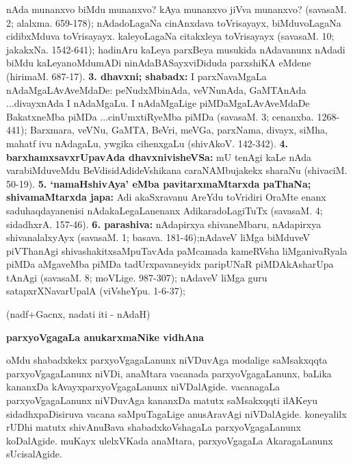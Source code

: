 \medskip
\noindent
nAda munanxvo biMdu munanxvo? kAya munanxvo jiVva \hbox{munanxvo}? (savasaM. 2; alalxma. 659-178); nAdadoLagaNa cinAnxdava toVrisayayx, biMduvoLagaNa cidibxMduva toVrisayayx. kaleyoLagaNa citakxleya toVrisayayx (savasaM. 10; jakakxNa. 1542-641); hadinAru kaLeya parxBeya musukida nAdavanunx nAdadi biMdu kaLeyanoMdumADi ninAda\-BASayxviDiduda parxshiKA eMdene (hirimaM. 687-17). \textbf{3. dhavxni; shabadx:}
I parxNavaMgaLa nAdaMgaLAvAveMdaDe: peNudxMbi\-nAda, veVNunAda, GaMTAnAda ...divayxnAda I nAdaM\-gaLu. I nAdaMgaLige piMDaMgaLAvAveMdaDe BakatxneMba piMDa ...cinUmxtiR\-yeMba piMDa (savasaM. 3; cenanxba. 1268-441); Barxmara, veVNu, GaMTA, BeVri, meVGa, parxNama, divayx, siMha, mahatf ivu nAda\-gaLu, ywgika cihenx\-gaLu (shivAkoV. 142-342). \textbf{4. barxhamx\-savxrUpavAda dhavxnivisheVSa:}
mU{\ru} te{\ra}nAgi kaLe nAda varabiMdu\-veMdu BeVdisidAdideVshikana caraNAMbujakekx \hbox{sharaNu} (shivaciM. 50-19). \textbf{5. `namaHshivAya' eMba pavitarxmaMtarxda paThaNa; shivamaMtarxda japa:} Adi akaSxravanu AreYdu toVridiri OraMte enanx saduhaqdayanenisi nAdakaLegaLanenanx AdikaradoLagiTuTx (savasaM. 4; \hbox{sidadhxrA}. 157-46). \textbf{6. parashiva:} nAdapirxya shiva\-neMbaru, nAdapirxya shivanalalxyAyx (savasaM. 1; basava. 181-46);\break nAdaveV liMga biMduveV piVThanAgi shivashakitxsaMpuTavAda \hbox{paMcamada} kameRVsha liMganivaRyala piMDa aMgaveMba piMDa tadUrxpa\-vaneyidx paripUNaR piMDAkAsharUpa tAnAgi (savasaM. 8; moVLige. 987-307); nAdaveV liMga guru satapxrXNava\-rUpalA (viVsheYpu. 1-6-37);

\medskip
\noindent
(nadf+Gacnx, nadati iti - nAdaH)

\newpage

\begin{center}
{\large\bf parxyoVgagaLa anukarxmaNike vidhAna}
\end{center}
\medskip

oMdu shabadxkekx parxyoVgagaLanunx niVDuvAga modalige saMsakxqqta parxyoVgagaLanunx niVDi, anaMtara vacanada parxyoVgagaLanunx, baLika kananxDa kAvayxparxyoVgagaLanunx niVDalAgide. vacanagaLa parxyoVgagaLanunx niVDuvAga kananxDa matutx saMsakxqqti ilAKeyu sidadhxpaDisiruva vacana saMpuTagaLige anusAravAgi niVDalAgide. koneyalilx rUDhi matutx shivAnuBava shabadxkoVshagaLa parxyoVgagaLanunx koDalAgide. muKayx ulelxVKada anaMtara, parxyoVgagaLa AkaragaLanunx sUcisalAgide.

\medskip

